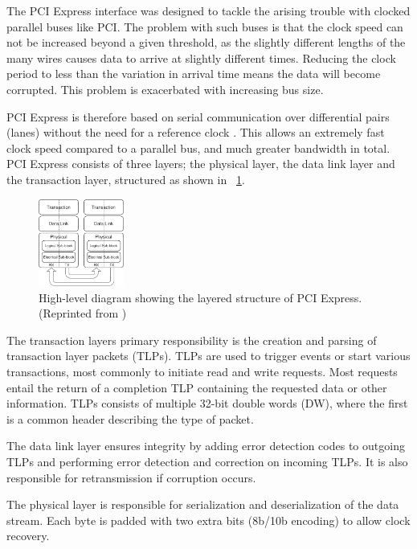 The PCI Express interface was designed to tackle the arising trouble with clocked parallel buses like PCI.
The problem with such buses is that the clock speed can not be increased beyond a given threshold, as the slightly different lengths of the many wires causes data to arrive at slightly different times.
Reducing the clock period to less than the variation in arrival time means the data will become corrupted.
This problem is exacerbated with increasing bus size.

PCI Express is therefore based on serial communication over differential pairs (lanes\footnotemark) without the need for a reference clock \cite{pcie}.
This allows an extremely fast clock speed compared to a parallel bus, and much greater bandwidth in total.
PCI Express consists of three layers; the physical layer, the data link layer and the transaction layer, structured as shown in \figurename~\ref{fig:pcie}.

\begin{figure}[!ht]
    \centering
    \includegraphics[width=0.25\textwidth]{figures/pcie}
    \caption{High-level diagram showing the layered structure of PCI Express. (Reprinted from \cite{pcie})}
    \label{fig:pcie}
\end{figure}

The transaction layers primary responsibility is the creation and parsing of transaction layer packets (TLPs).
TLPs are used to trigger events or start various transactions, most commonly to initiate read and write requests\footnotemark.
Most requests entail the return of a completion TLP containing the requested data or other information.
TLPs consists of multiple 32-bit double words (DW), where the first is a common header describing the type of packet.

The data link layer ensures integrity by adding error detection codes to outgoing TLPs and performing error detection and correction on incoming TLPs.
It is also responsible for retransmission if corruption occurs.

The physical layer is responsible for serialization and deserialization of the data stream.
Each byte is padded with two extra bits (8b/10b encoding) to allow clock recovery.

